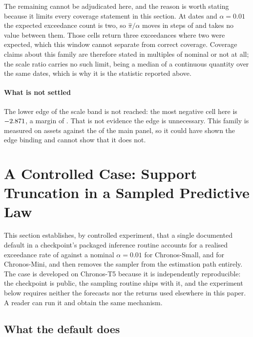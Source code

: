 \documentclass[preprint,11pt,authoryear]{elsarticle}
\newcommand{\1}{\boldsymbol{1}}
\begin{document}
The remaining \nMLBlockedNotUnder{} cannot be adjudicated here, and the reason is
worth stating because it limits every coverage statement in this section. At
\nMLDates{} dates and $\alpha = 0.01$ the expected exceedance count is two, so
$\hat\pi/\alpha$ moves in steps of \nMLPiGrid{} and takes no value between them.
Those \nMLBlockedNotUnder{} cells return three exceedances where two were
expected, which this window cannot separate from correct coverage. Coverage
claims about this family are therefore stated in multiples of \nMLPiGrid{}
nominal or not at all; the scale ratio carries no such limit, being a median of a
continuous quantity over the same \nMLDates{} dates, which is why it is the
statistic reported above.

\paragraph{What is not settled} The lower edge of the scale band is not reached:
the most negative cell here is $-2.871$, a margin of
\nMLLowerEdgeMargin. That is not evidence the edge is unnecessary. This family is
measured on \nMLAssets{} assets against the \nMainAssets{} of the main panel, so
it could have shown the edge binding and cannot show that it does not.

\section{A Controlled Case: Support Truncation in a Sampled Predictive Law}
\label{app:mechanism}

This section establishes, by controlled experiment, that a single documented
default in a checkpoint's packaged inference routine accounts for a realised
exceedance rate of \nPiSmallDefaultOne{} against a nominal $\alpha = 0.01$ for
Chronos-Small, and \nPiMiniDefaultOne{} for Chronos-Mini, and then removes the
sampler from the estimation path entirely. The case is developed on Chronos-T5
\citep{ansari2024chronos} because it is independently reproducible: the
checkpoint is public, the sampling routine ships with it, and the experiment
below requires neither the forecasts nor the returns used elsewhere in this
paper. A reader can run it and obtain the same mechanism.

\subsection{What the default does}
\label{app:mech_default}
\end{document}
